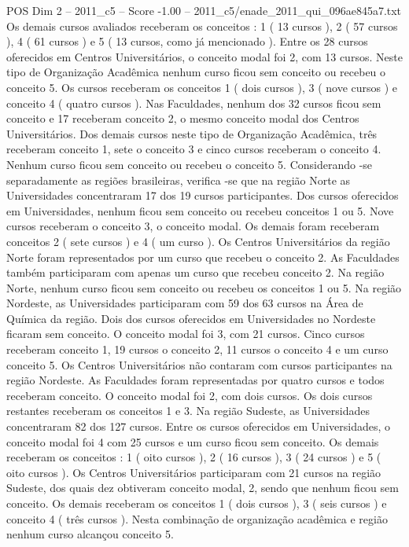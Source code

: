 \begin{textsample}{POS Dim 2 – 2011\_c5 – Score -1.00 – 2011\_c5/enade\_2011\_qui\_096ae845a7.txt}
Os demais cursos avaliados receberam os conceitos : 1 ( 13 cursos ), 2 ( 57 cursos ), 4 ( 61 cursos ) e 5 ( 13 cursos, como já mencionado ).
Entre os 28 cursos oferecidos em Centros Universitários, o conceito modal foi 2, com 13 cursos.
Neste tipo de Organização Acadêmica nenhum curso ficou sem conceito ou recebeu o conceito 5.
Os cursos receberam os conceitos 1 ( dois cursos ), 3 ( nove cursos ) e conceito 4 ( quatro cursos ).
Nas Faculdades, nenhum dos 32 cursos ficou sem conceito e 17 receberam conceito 2, o mesmo conceito modal dos Centros Universitários.
Dos demais cursos neste tipo de Organização Acadêmica, três receberam conceito 1, sete o conceito 3 e cinco cursos receberam o conceito 4.
Nenhum curso ficou sem conceito ou recebeu o conceito 5.
Considerando -se separadamente as regiões brasileiras, verifica -se que na região Norte as Universidades concentraram 17 dos 19 cursos participantes.
Dos cursos oferecidos em Universidades, nenhum ficou sem conceito ou recebeu conceitos 1 ou 5.
Nove cursos receberam o conceito 3, o conceito modal.
Os demais foram receberam conceitos 2 ( sete cursos ) e 4 ( um curso ).
Os Centros Universitários da região Norte foram representados por um curso que recebeu o conceito 2.
As Faculdades também participaram com apenas um curso que recebeu conceito 2.
Na região Norte, nenhum curso ficou sem conceito ou recebeu os conceitos 1 ou 5.
Na região Nordeste, as Universidades participaram com 59 dos 63 cursos na Área de Química da região.
Dois dos cursos oferecidos em Universidades no Nordeste ficaram sem conceito.
O conceito modal foi 3, com 21 cursos.
Cinco cursos receberam conceito 1, 19 cursos o conceito 2, 11 cursos o conceito 4 e um curso conceito 5.
Os Centros Universitários não contaram com cursos participantes na região Nordeste.
As Faculdades foram representadas por quatro cursos e todos receberam conceito.
O conceito modal foi 2, com dois cursos.
Os dois cursos restantes receberam os conceitos 1 e 3.
Na região Sudeste, as Universidades concentraram 82 dos 127 cursos.
Entre os cursos oferecidos em Universidades, o conceito modal foi 4 com 25 cursos e um curso ficou sem conceito.
Os demais receberam os conceitos : 1 ( oito cursos ), 2 ( 16 cursos ), 3 ( 24 cursos ) e 5 ( oito cursos ).
Os Centros Universitários participaram com 21 cursos na região Sudeste, dos quais dez obtiveram conceito modal, 2, sendo que nenhum ficou sem conceito.
Os demais receberam os conceitos 1 ( dois cursos ), 3 ( seis cursos ) e conceito 4 ( três cursos ).
Nesta combinação de organização acadêmica e região nenhum curso alcançou conceito 5.

\end{textsample}
